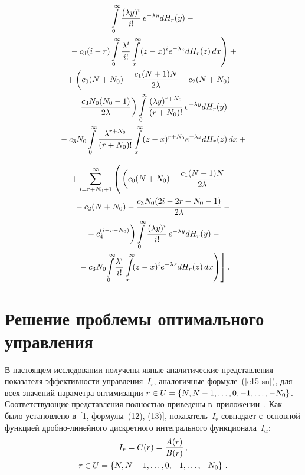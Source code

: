\begin{multicols}{2}
\begin{multline*}
\int\limits_0^\infty \fr{(\lambda y)^i}{i!}\,e^{-\lambda y} dH_r(y)-{}\\
\left.{}-
  c_3(i-r)\int\limits_0^\infty \fr{\lambda^i}{i!}
   \int\limits_x^\infty (z-x)^i  
e^{-\lambda z} dH_r(z)\,dx\right) +{}\\
{}+
  \left( 
  \vphantom{\fr{c_1(N+1)N}{2\lambda}}
  c_0(N+N_0)-
  \fr{c_1(N+1)N}{2\lambda} -c_2(N+N_0) -{}\right.\\
\left.  {}-
  \fr{c_3N_0(N_0-1)}{2\lambda}  \right)
 \int\limits_0^\infty \fr{(\lambda 
y)^{r+N_0}}{(r+N_0)!}\,e^{-\lambda y} dH_r(y) -{}\\
{}-c_3 N_0
  \int\limits_0^\infty \fr{\lambda^{r+N_0}}{(r+N_0)!} 
\int\limits_x^\infty (z-x)^{r+N_0}e^{-\lambda z} dH_r(z)\,dx+{}
\end{multline*}

\noindent
\begin{multline}
{}+
  \sum\limits^\infty_{i=r+N_0+1} \left(
  \vphantom{\int\limits_0^\infty}
  \left(
  c_0(N+N_0) -\fr{c_1(N+1)N}{2\lambda} -{}\right.\right.\\
{}-c_2(N+N_0) -\fr{c_3 N_0 (2i- 2r- 
N_0-1)}{2\lambda} -{}\\
\left.{}- c_4^{(i-r-N_0)}
   \vphantom{\fr{c_1(N+1)N}{2\lambda}}
   \right) \int\limits_0^\infty \fr{(\lambda 
y)^i}{i!} \, e^{-\lambda y} dH_r(y)-{}\\
   \left.\left.{}-c_3 N_0\! \int\limits_0^\infty\! \fr{\lambda^i}{i!} 
\int\limits_x^\infty \!(z-x)^i e^{-\lambda z} dH_r(z)\,dx\right)\right].
  \label{e15-sn}
  \end{multline}
  
  \vspace*{-12pt}

\section{Решение проблемы оптимального управления}

  В настоящем исследовании получены явные аналитические пред\-став\-ле\-ния 
показателя эффективности управ\-ле\-ния~$I_r$, аналогичные  
формуле~(\ref{e15-sn}), для всех значений па\-ра\-мет\-ра оптимизации $r\hm\in 
U\hm= \{ N, N-1, \ldots , 0, -1, \ldots , -N_0\}$. Соответст\-ву\-ющие пред\-став\-ле\-ния 
пол\-ностью приведены  
в~приложении~\cite{5-sn}. Как было уста\-нов\-ле\-но в~[1,  
формулы~(12), (13)], показатель~$I_r$ совпадает 
с~основной функцией  
дроб\-но-ли\-ней\-но\-го дискретного интегрального функционала~$I_\alpha$:
  \begin{multline}
  I_r=C(r)=\displaystyle\frac{\displaystyle A(r)\mathstrut}{\displaystyle B(r)\mathstrut}\,,\\ 
  r\in U=\left\{ N, N-1, \ldots , 0, -1, \ldots , -
N_0\right\}\,.
  \label{e16-sn}
  \end{multline}
  

\end{multicols}
